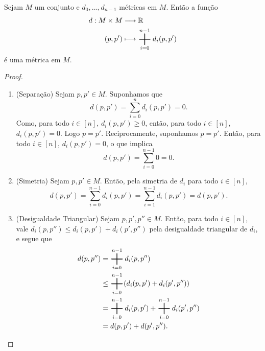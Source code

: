 \begin{prop}
Sejam $M$ um conjunto e $d_0, \dots, d_{n-1}$ métricas em $M$. Então a função
	\begin{align*}
		\func{d}{M \times M}{\R}{(p,p')}{\sum_{i=0}^{n-1} d_i(p,p')}
	\end{align*}
é uma métrica em $M$.
\end{prop}
\begin{proof}
	\begin{enumerate}
	\item (Separação) Sejam $p,p' \in M$. Suponhamos que
	\begin{equation*}
	d(p,p') = \sum_{i=0}^n d_i(p,p') = 0.
	\end{equation*}
Como, para todo $i \in [n]$, $d_i(p,p') \geq 0$, então, para todo $i \in [n]$, $d_i(p,p') = 0$. Logo $p=p'$. Reciprocamente, suponhamos $p=p'$. Então, para todo $i \in [n]$, $d_i(p,p')=0$, o que implica
	\begin{equation*}
	d(p,p') = \sum_{i=0}^{n-1} 0 = 0.
	\end{equation*}
	
	\item (Simetria) Sejam $p,p' \in M$. Então, pela simetria de $d_i$ para todo $i \in [n]$,
	\begin{equation*}
	d(p,p') = \sum_{i=0}^{n-1} d_i(p,p') = \sum_{i=1}^{n-1} d_i(p,p') = d(p,p').
	\end{equation*}
	
	\item (Desigualdade Triangular) Sejam $p,p',p'' \in M$. Então, para todo $i \in [n]$, vale $d_i(p,p'') \leq d_i(p,p')+d_i(p',p'')$ pela desigualdade triangular de $d_i$, e segue que
	\begin{align*}
	d(p,p'') &= \sum_{i=0}^{n-1} d_i(p,p'') \\
				&\leq \sum_{i=0}^{n-1} (d_i(p,p')+d_i(p',p'')) \\
				&= \sum_{i=0}^{n-1} d_i(p,p') + \sum_{i=0}^{n-1} d_i(p',p'') \\
				&= d(p,p')+d(p',p''). \qedhere
	\end{align*}
	\end{enumerate}
\end{proof}

